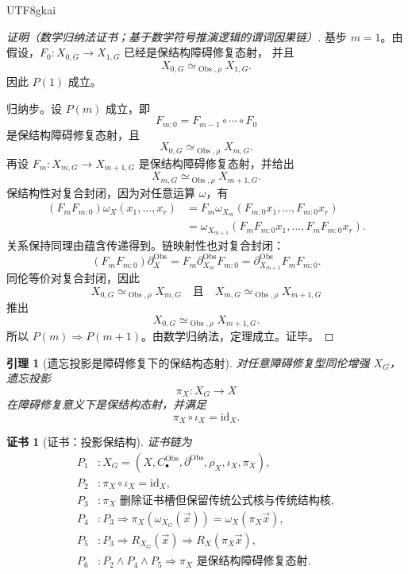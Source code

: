 \documentclass[12pt]{article}
\newtheorem{lemma}{引理}[section]
\newtheorem{Certificate}{证书}[section]
\newcommand{\id}{\mathrm{id}}
\DeclareMathOperator{\Obs}{Obs}
\begin{document}
\begin{CJK*}{UTF8}{gkai}
\begin{proof}[证明（数学归纳法证书；基于数学符号推演逻辑的谓词因果链）]
基步 \(m=1\)。由假设，\(F_0:X_{0,G}\to X_{1,G}\) 已经是保结构障碍修复态射，
并且
\[
  X_{0,G}\simeq_{\Obs,\rho}X_{1,G}.
\]
因此 \(P(1)\) 成立。

归纳步。设 \(P(m)\) 成立，即
\[
  F_{m:0}=F_{m-1}\circ\cdots\circ F_0
\]
是保结构障碍修复态射，且
\[
  X_{0,G}\simeq_{\Obs,\rho}X_{m,G}.
\]
再设 \(F_m:X_{m,G}\to X_{m+1,G}\) 是保结构障碍修复态射，并给出
\[
  X_{m,G}\simeq_{\Obs,\rho}X_{m+1,G}.
\]
保结构性对复合封闭，因为对任意运算 \(\omega\)，有
\[
\begin{aligned}
  (F_mF_{m:0})\omega_X(x_1,\ldots,x_r)
  &=
  F_m\omega_{X_m}(F_{m:0}x_1,\ldots,F_{m:0}x_r)\\
  &=
  \omega_{X_{m+1}}
  (F_mF_{m:0}x_1,\ldots,F_mF_{m:0}x_r).
\end{aligned}
\]
关系保持同理由蕴含传递得到。链映射性也对复合封闭：
\[
  (F_mF_{m:0})\partial_X^{\Obs}
  =
  F_m\partial_{X_m}^{\Obs}F_{m:0}
  =
  \partial_{X_{m+1}}^{\Obs}F_mF_{m:0}.
\]
同伦等价对复合封闭，因此
\[
  X_{0,G}\simeq_{\Obs,\rho}X_{m,G}
  \quad\text{且}\quad
  X_{m,G}\simeq_{\Obs,\rho}X_{m+1,G}
\]
推出
\[
  X_{0,G}\simeq_{\Obs,\rho}X_{m+1,G}.
\]
所以 \(P(m)\Rightarrow P(m+1)\)。由数学归纳法，定理成立。证毕。
\end{proof}

\begin{lemma}[遗忘投影是障碍修复下的保结构态射]
\label{lem:tex59-projection-structure-preserving}
对任意障碍修复型同伦增强 \(X_G\)，遗忘投影
\[
  \pi_X:X_G\to X
\]
在障碍修复意义下是保结构态射，并满足
\[
  \pi_X\circ\iota_X=\id_X.
\]
\end{lemma}

\begin{Certificate}[证书：投影保结构]
\label{cert:tex59-projection-structure-preserving}
证书链为
\[
\begin{aligned}
  P_1 &: X_G=(X,C_\bullet^{\Obs},\partial^{\Obs},\rho_X,\iota_X,\pi_X),\\
  P_2 &: \pi_X\circ\iota_X=\id_X,\\
  P_3 &: \pi_X\text{ 删除证书槽但保留传统公式核与传统结构核},\\
  P_4 &: P_3\Rightarrow
         \pi_X(\omega_{X_G}(\vec x))
         =
         \omega_X(\pi_X\vec x),\\
  P_5 &: P_3\Rightarrow
         R_{X_G}(\vec x)\Rightarrow R_X(\pi_X\vec x),\\
  P_6 &: P_2\wedge P_4\wedge P_5
         \Rightarrow
         \pi_X\text{ 是保结构障碍修复态射}.
\end{aligned}
\]
\end{Certificate}


\end{CJK*}
\end{document}
